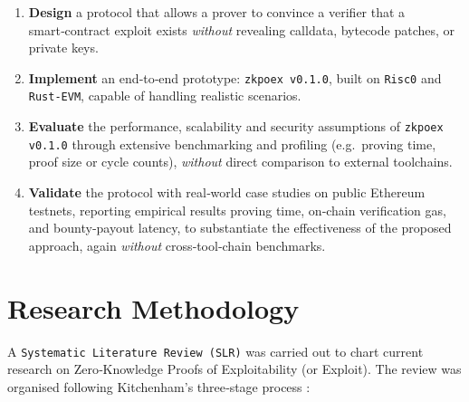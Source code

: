 \begin{enumerate}
    \item \textbf{Design} a protocol that allows a prover to convince a verifier that a smart‑contract exploit exists \textit{without} revealing calldata, bytecode patches, or private keys.
    \item \textbf{Implement} an end‑to‑end prototype: \texttt{zkpoex v0.1.0}, built on \texttt{Risc0}\cite{risc0} and \texttt{Rust‑EVM}\cite{rustEVM}, capable of handling realistic scenarios.
    \item \textbf{Evaluate} the performance, scalability and security assumptions of \texttt{zkpoex v0.1.0} through extensive benchmarking and profiling (e.g.\ proving time, proof size or cycle counts), \textit{without} direct comparison to external toolchains.
    \item \textbf{Validate} the protocol with real‑world case studies on public Ethereum testnets, reporting empirical results proving time, on‑chain verification gas, and bounty‑payout latency, to substantiate the effectiveness of the proposed approach, again \textit{without} cross‑tool‑chain benchmarks.

\end{enumerate}


\section{Research Methodology}\label{slr} %

A \texttt{Systematic Literature Review (SLR)} was carried out to chart current research on Zero‑Knowledge Proofs of Exploitability (or Exploit).  
The review was organised following Kitchenham’s three‑stage process \cite{Kitchenham}:

